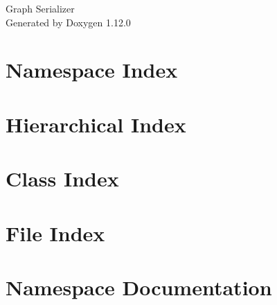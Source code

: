 \documentclass[twoside]{book}
\newcommand{\+}{\discretionary{\mbox{\scriptsize$\hookleftarrow$}}{}{}}
\newcommand{\clearemptydoublepage}{%
    \newpage{\pagestyle{empty}\cleardoublepage}%
  }
\begin{document}
  \raggedbottom
    \hypersetup{pageanchor=false,
                bookmarksnumbered=true,
                pdfencoding=unicode
               }
  \begin{titlepage}
  \vspace*{7cm}
  \begin{center}%
  {\Large Graph Serializer}\\
  \vspace*{1cm}
  {\large Generated by Doxygen 1.12.0}\\
  \end{center}
  \end{titlepage}
  \clearemptydoublepage
  \tableofcontents
  \clearemptydoublepage
  \hypersetup{pageanchor=true}

\chapter{Namespace Index}

\chapter{Hierarchical Index}

\chapter{Class Index}

\chapter{File Index}

\chapter{Namespace Documentation}

\end{document}
